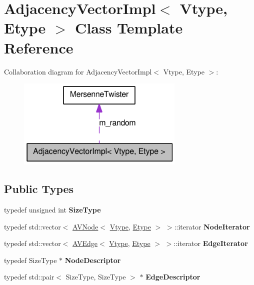 \hypertarget{class_adjacency_vector_impl}{
\section{AdjacencyVectorImpl$<$ Vtype, Etype $>$ Class Template Reference}
\label{class_adjacency_vector_impl}
}


Collaboration diagram for AdjacencyVectorImpl$<$ Vtype, Etype $>$:\nopagebreak
\begin{figure}[H]
\begin{center}
\leavevmode
\includegraphics[width=226pt]{class_adjacency_vector_impl__coll__graph}
\end{center}
\end{figure}
\subsection*{Public Types}
\begin{DoxyCompactItemize}
\item 
\hypertarget{class_adjacency_vector_impl_aecef16149f96ee5305cb54c96fba1103}{
typedef unsigned int {\bfseries SizeType}}
\label{class_adjacency_vector_impl_aecef16149f96ee5305cb54c96fba1103}

\item 
\hypertarget{class_adjacency_vector_impl_a96cadfdef827b0b7e715dfcb36478442}{
typedef std::vector$<$ \hyperlink{class_a_v_node}{AVNode}$<$ \hyperlink{class_vtype}{Vtype}, \hyperlink{class_etype}{Etype} $>$ $>$::iterator {\bfseries NodeIterator}}
\label{class_adjacency_vector_impl_a96cadfdef827b0b7e715dfcb36478442}

\item 
\hypertarget{class_adjacency_vector_impl_a38c66949a755821a57422c28813d3560}{
typedef std::vector$<$ \hyperlink{class_a_v_edge}{AVEdge}$<$ \hyperlink{class_vtype}{Vtype}, \hyperlink{class_etype}{Etype} $>$ $>$::iterator {\bfseries EdgeIterator}}
\label{class_adjacency_vector_impl_a38c66949a755821a57422c28813d3560}

\item 
\hypertarget{class_adjacency_vector_impl_a1307f215e53c3a4776b74b42e9390fd7}{
typedef SizeType $\ast$ {\bfseries NodeDescriptor}}
\label{class_adjacency_vector_impl_a1307f215e53c3a4776b74b42e9390fd7}

\item 
\hypertarget{class_adjacency_vector_impl_ac44c2e8468160ee05db2bfedc25c417e}{
typedef std::pair$<$ SizeType, SizeType $>$ $\ast$ {\bfseries EdgeDescriptor}}
\label{class_adjacency_vector_impl_ac44c2e8468160ee05db2bfedc25c417e}

\end{DoxyCompactItemize}
